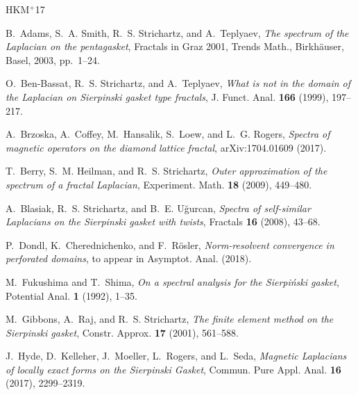 \documentclass[12pt,reqno,a4paper]{amsart}            %
\numberwithin{equation}{section}
\theoremstyle{mythmstyle}       %
\theoremstyle{mydefstyle}        %
\newcommand{\1}{\mathbbm 1}                    %
\begin{document}
\newcommand{\etalchar}[1]{$^{#1}$}
\def\cprime{$'$}
\providecommand{\bysame}{\leavevmode\hbox to3em{\hrulefill}\thinspace}
\providecommand{\MR}{\relax\ifhmode\unskip\space\fi MR }
\providecommand{\MRhref}[2]{%
  \href{http://www.ams.org/mathscinet-getitem?mr=#1}{#2}
}
\providecommand{\href}[2]{#2}
\begin{thebibliography}{HKM{\etalchar{+}}17}

B.~Adams, S.~A. Smith, R.~S. Strichartz, and A.~Teplyaev, \emph{The spectrum of
  the {L}aplacian on the pentagasket}, Fractals in {G}raz 2001, Trends Math.,
  Birkh\"auser, Basel, 2003, pp.~1--24.

O.~Ben-Bassat, R.~S. Strichartz, and A.~Teplyaev, \emph{What is not in the
  domain of the {L}aplacian on {S}ierpinski gasket type fractals}, J. Funct.
  Anal. \textbf{166} (1999), 197--217.

\bibitem[BCH{\etalchar{+}}17]{bchlr:pre17}
A.~Brzoska, A.~Coffey, M.~Hansalik, S.~Loew, and L.~G. Rogers, \emph{Spectra of
  magnetic operators on the diamond lattice fractal}, arXiv:1704.01609 (2017).

T.~Berry, S.~M. Heilman, and R.~S. Strichartz, \emph{Outer approximation of the
  spectrum of a fractal {L}aplacian}, Experiment. Math. \textbf{18} (2009),
  449--480.

A.~Blasiak, R.~S. Strichartz, and B.~E. U{\u g}urcan, \emph{Spectra of
  self-similar {L}aplacians on the {S}ierpinski gasket with twists}, Fractals
  \textbf{16} (2008), 43--68.

P.~Dondl, K.~Cherednichenko, and F.~R\"osler, \emph{Norm-resolvent convergence
  in perforated domains}, to appear in Asymptot. Anal. (2018).

M.~Fukushima and T.~Shima, \emph{On a spectral analysis for the {S}ierpi\'nski
  gasket}, Potential Anal. \textbf{1} (1992), 1--35.

M.~Gibbons, A.~Raj, and R.~S. Strichartz, \emph{The finite element method on
  the {S}ierpinski gasket}, Constr. Approx. \textbf{17} (2001), 561--588.

\bibitem[HKM{\etalchar{+}}17]{hkmrs:17}
J.~Hyde, D.~Kelleher, J.~Moeller, L.~Rogers, and L.~Seda, \emph{Magnetic
  {L}aplacians of locally exact forms on the {S}ierpinski {G}asket}, Commun.
  Pure Appl. Anal. \textbf{16} (2017), 2299--2319.


\end{thebibliography}
\end{document}
